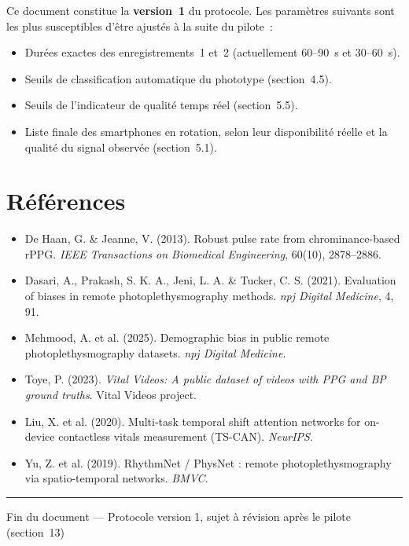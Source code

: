\documentclass[11pt,a4paper]{article}
\begin{document}
Ce document constitue la \textbf{version~1} du protocole. Les param\`etres
suivants sont les plus susceptibles d'\^etre ajust\'es \`a la suite du
pilote~:

\begin{itemize}
\item Dur\'ees exactes des enregistrements~1 et~2 (actuellement 60--90~s et
30--60~s).
\item Seuils de classification automatique du phototype (section~4.5).
\item Seuils de l'indicateur de qualit\'e temps r\'eel (section~5.5).
\item Liste finale des smartphones en rotation, selon leur disponibilit\'e
r\'eelle et la qualit\'e du signal observ\'ee (section~5.1).
\end{itemize}

\newpage

\section*{R\'ef\'erences}

\begin{itemize}
\item De Haan, G. \& Jeanne, V. (2013). Robust pulse rate from
chrominance-based rPPG. \emph{IEEE Transactions on Biomedical Engineering},
60(10), 2878--2886.
\item Dasari, A., Prakash, S. K. A., Jeni, L. A. \& Tucker, C. S. (2021).
Evaluation of biases in remote photoplethysmography methods. \emph{npj
Digital Medicine}, 4, 91.
\item Mehmood, A. et al. (2025). Demographic bias in public remote
photoplethysmography datasets. \emph{npj Digital Medicine}.
\item Toye, P. (2023). \emph{Vital Videos: A public dataset of videos with
PPG and BP ground truths}. Vital Videos project.
\item Liu, X. et al. (2020). Multi-task temporal shift attention networks
for on-device contactless vitals measurement (TS-CAN). \emph{NeurIPS}.
\item Yu, Z. et al. (2019). RhythmNet / PhysNet : remote photoplethysmography
via spatio-temporal networks. \emph{BMVC}.
\end{itemize}

\vspace{0.6cm}
\noindent\rule{\textwidth}{0.4pt}
\begin{center}
\small Fin du document --- Protocole version 1, sujet \`a r\'evision apr\`es
le pilote (section~13)
\end{center}
\end{document}
